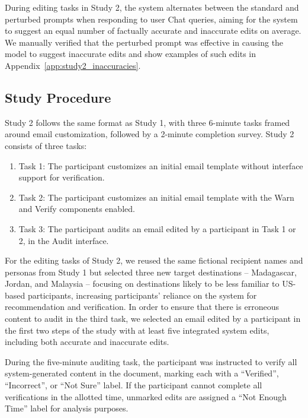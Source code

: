 \documentclass[manuscript]{acmart}
\begin{document}
During editing tasks in Study 2, the system alternates between the standard and perturbed prompts when responding to user Chat queries, aiming for the system to suggest an equal number of factually accurate and inaccurate edits on average. We manually verified that the perturbed prompt was effective in causing the model to suggest inaccurate edits and show examples of such edits in Appendix~\ref{app:study2_inaccuracies}.

\subsection{Study Procedure} \label{sec:study2_procedure}

Study 2 follows the same format as Study 1, with three 6-minute tasks framed around email customization, followed by a 2-minute completion survey. Study 2 consists of three tasks:

\begin{enumerate}
    \item Task 1: The participant customizes an initial email template without interface support for verification. 
    \item Task 2: The participant customizes an initial email template with the Warn and Verify components enabled.
    \item Task 3: The participant audits an email edited by a participant in Task 1 or 2, in the Audit interface. 
\end{enumerate}

For the editing tasks of Study 2, we reused the same fictional recipient names and personas from Study 1 but selected three new target destinations -- Madagascar, Jordan, and Malaysia -- focusing on destinations likely to be less familiar to US-based participants, increasing participants' reliance on the system for recommendation and verification.
In order to ensure that there is erroneous content to audit in the third task, we selected an email edited by a participant in the first two steps of the study with at least five integrated system edits, including both accurate and inaccurate edits.

During the five-minute auditing task, the participant was instructed to verify all system-generated content in the document, marking each with a ``Verified'', ``Incorrect'', or ``Not Sure'' label. If the participant cannot complete all verifications in the allotted time, unmarked edits are assigned a ``Not Enough Time'' label for analysis purposes.
\end{document}

